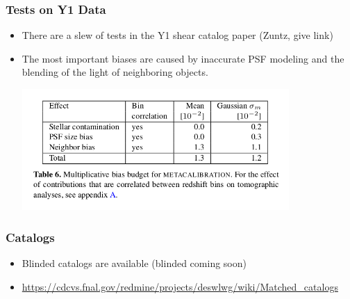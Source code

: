 \documentclass{beamer}
\begin{document}
\frame
{


    \frametitle{Tests on Y1 Data}

    \begin{itemize}

        \item There are a slew of tests in the Y1 shear catalog paper (Zuntz,
            give link)

        \item The most important biases are caused by inaccurate PSF modeling
            and the blending of the light of neighboring objects.



        \begin{center}
            \includegraphics[width=0.8\textwidth]{mcal-bias.png}
            \newline
        \end{center}


    \end{itemize}

}


\frame
{
    \frametitle{Catalogs}

    \begin{itemize}
        \item Blinded catalogs are available (blinded coming soon)

        \item \url{https://cdcvs.fnal.gov/redmine/projects/deswlwg/wiki/Matched_catalogs}


    \end{itemize}
}
\end{document}

